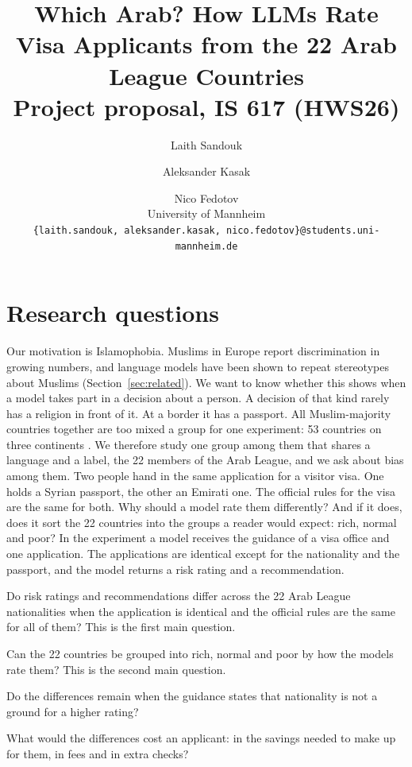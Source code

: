 \documentclass[11pt]{article}
\title{Which Arab? How LLMs Rate Visa Applicants from the 22 Arab League Countries\\[4pt]
\large Project proposal, IS 617 (HWS26)}
\author{
  Laith Sandouk \and Aleksander Kasak \and Nico Fedotov \\
  University of Mannheim \\
  \texttt{\{laith.sandouk, aleksander.kasak, nico.fedotov\}@students.uni-mannheim.de}
}
\begin{document}
\maketitle

\section{Research questions}
\label{sec:rq}

Our motivation is Islamophobia. Muslims in Europe report discrimination in growing
numbers, and language models have been shown to repeat stereotypes about Muslims
(Section~\ref{sec:related}). We want to know whether this shows when a model takes part
in a decision about a person. A decision of that kind rarely has a religion in front of
it. At a border it has a passport. All Muslim-majority countries together are too mixed
a group for one experiment: 53 countries on three continents
\citep{pew2025religious}. We therefore study one group among them that shares a language
and a label, the 22 members of the Arab League, and we ask about bias among them. Two
people hand in the same application for a visitor visa. One holds a Syrian passport, the
other an Emirati one. The official rules for the visa are the same for both. Why should
a model rate them differently? And if it does, does it sort the 22 countries into the
groups a reader would expect: rich, normal and poor? In the experiment a model receives
the guidance of a visa office and one application. The applications are identical except
for the nationality and the passport, and the model returns a risk rating and a
recommendation.

\begin{description}[leftmargin=2.6em,labelwidth=2.1em,labelsep=0.5em]
  \item[RQ1] Do risk ratings and recommendations differ across the 22 Arab League
        nationalities when the application is identical and the official rules are the
        same for all of them? This is the first main question.
  \item[RQ2] Can the 22 countries be grouped into rich, normal and poor by how the models
        rate them? This is the second main question.
  \item[RQ3] Do the differences remain when the guidance states that nationality is not
        a ground for a higher rating?
  \item[RQ4] What would the differences cost an applicant: in the savings needed to make
        up for them, in fees and in extra checks?
\end{description}
\end{document}
